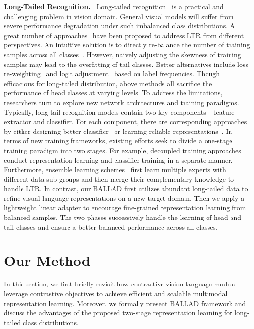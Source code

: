 \documentclass[10pt,twocolumn,letterpaper]{article}
\newcommand{\approach}{\textsc{BALLAD}}
\begin{document}
\noindent\textbf{Long-Tailed Recognition.~}
Long-tailed recognition~\cite{zhang2021deep} is a practical and challenging problem in vision domain. General visual models will suffer from severe performance degradation under such imbalanced class distributions.
A great number of approaches~\cite{huang2016learning,ouyang2016factors,zhang2017range,dong2017class,yin2019feature,menon2021longtail,cui2021parametric,wang2021longtailed,Samuel_2021_ICCV,cui2021reslt} have been proposed to address LTR from different perspectives. An intuitive solution is to directly re-balance the number of training samples across all classes~\cite{Kang2020Decoupling,zhou2020bbn}. However, naively adjusting the skewness of training samples may lead to the overfitting of tail classes. Better alternatives include loss re-weighting~\cite{lin2017focal,kang2019few,hong2021disentangling} and logit adjustment~\cite{menon2021longtail,zhang2021distribution} based on label frequencies. Though efficacious for long-tailed distribution, above methods all sacrifice the performance of head classes at 
varying levels. To address the limitations, researchers turn to explore new network architectures and training paradigms. Typically, long-tail recognition models contain two 
key components -- feature extractor and classifier. For each component, there are corresponding approaches by either designing better classifier~\cite{liu2020deep,tang2020long,wu2020solving} or learning reliable representations~\cite{liu2019large,zhu2020inflated}.
In terms of new training frameworks, existing efforts seek to divide a one-stage training paradigm into two stages. For example, decoupled training approaches~\cite{Kang2020Decoupling,kang2021exploring} conduct representation learning and classifier training in a separate manner.
Furthermore, ensemble learning schemes~\cite{zhou2020bbn,zhang2021test} first learn multiple experts with different data sub-groups and then merge their complementary knowledge to handle LTR.
In contrast, our \approach{} first utilizes abundant long-tailed data to refine visual-language representations on a new target domain. Then we apply a lightweight linear adapter to encourage fine-grained representation learning from balanced samples. The two phases successively handle the learning of head and tail classes and ensure a better balanced performance across all classes.


\section{Our Method}
\label{method}
In this section, we first briefly revisit how contrastive vision-language models leverage contrastive objectives to achieve efficient and scalable multimodal representation learning. Moreover, we formally present \approach{} framework and discuss the advantages of the proposed two-stage representation learning for long-tailed class distributions.
\end{document}
